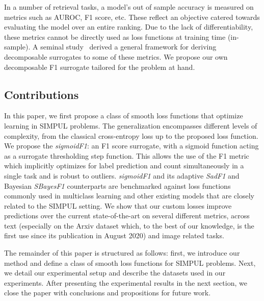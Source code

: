 
In a number of retrieval tasks, a model's out of sample accuracy is measured
on metrics such as AUROC, F1 score, etc. These reflect an objective catered
towards evaluating the model over an entire ranking. Due to the lack of
differentiability, these metrics cannot be directly used as loss functions at
training time (in-sample). A seminal study~\cite{optimizableLosses} derived a
general framework for deriving decomposable surrogates to some of these
metrics. We propose our own decomposable F1 surrogate tailored for the problem
at hand.

\subsection{Contributions}
In this paper, we first propose a class of smooth loss functions that optimize
learning in SIMPUL problems. The generalization encompasses different levels
of complexity, from the classical cross-entropy loss up to the proposed loss
function. We propose the \emph{sigmoidF1}: an F1 score surrogate, with a
sigmoid function acting as a surrogate thresholding step function. This allows
the use of the F1 metric which implicitly optimizes for label prediction and
count simultaneously in a single task and is robust to outliers.
\emph{sigmoidF1} and its adaptive \emph{SadF1} and Bayesian \emph{SBayesF1}
counterparts are benchmarked against loss functions commonly used in
multiclass learning and other existing models that are closely related to the
SIMPUL setting. We show that our custom losses improve predictions over the
current  state-of-the-art on several different metrics, across text
(especially on the Arxiv dataset which, to the best of our knowledge, is the
first use since its publication in August 2020) and image related tasks.

The remainder of this paper is structured as follows: first, we introduce
our method and define a class of smooth loss functions for SIMPUL problems.
Next, we detail our experimental setup and describe the datasets used in our
experiments. After presenting the experimental results in the next section,
we close the paper with conclusions and propositions for future work.

